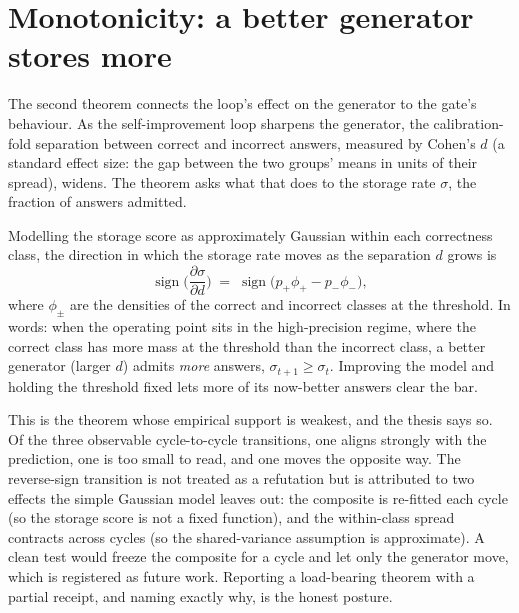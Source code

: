 \section{Monotonicity: a better generator stores more}
\label{sec:theory-monotone}

The second theorem connects the loop's effect on the generator to the gate's behaviour.
As the self-improvement loop sharpens the generator, the calibration-fold separation
between correct and incorrect answers, measured by Cohen's $d$ (a standard effect size:
the gap between the two groups' means in units of their spread), widens. The theorem asks
what that does to the storage rate $\sigma$, the fraction of answers admitted.

\begin{precise}
Modelling the storage score as approximately Gaussian within each correctness class, the
direction in which the storage rate moves as the separation $d$ grows is
\[
  \operatorname{sign}\!\Big(\frac{\partial \sigma}{\partial d}\Big)
  \;=\; \operatorname{sign}\big(p_+\phi_+ - p_-\phi_-\big),
\]
where $\phi_\pm$ are the densities of the correct and incorrect classes at the threshold.
In words: when the operating point sits in the high-precision regime, where the correct
class has more mass at the threshold than the incorrect class, a better generator (larger
$d$) admits \emph{more} answers, $\sigma_{t+1} \ge \sigma_t$. Improving the model and
holding the threshold fixed lets more of its now-better answers clear the bar.
\end{precise}

\begin{pitfall}
This is the theorem whose empirical support is weakest, and the thesis says so. Of the
three observable cycle-to-cycle transitions, one aligns strongly with the prediction, one
is too small to read, and one moves the opposite way. The reverse-sign transition is not
treated as a refutation but is attributed to two effects the simple Gaussian model leaves
out: the composite is re-fitted each cycle (so the storage score is not a fixed function),
and the within-class spread contracts across cycles (so the shared-variance assumption is
approximate). A clean test would freeze the composite for a cycle and let only the
generator move, which is registered as future work. Reporting a load-bearing theorem with
a partial receipt, and naming exactly why, is the honest posture.
\end{pitfall}

